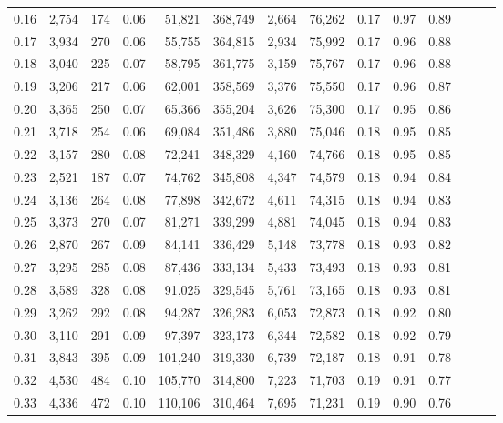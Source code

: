 \begin{tabular}{rrrrrrrrrrrrrr}
0.16 &   2,754 &    174 &  0.06 &   51,821 &  368,749 &   2,664 &  76,262 &  0.17 &  0.97 &      0.89 \\
0.17 &   3,934 &    270 &  0.06 &   55,755 &  364,815 &   2,934 &  75,992 &  0.17 &  0.96 &      0.88 \\
0.18 &   3,040 &    225 &  0.07 &   58,795 &  361,775 &   3,159 &  75,767 &  0.17 &  0.96 &      0.88 \\
0.19 &   3,206 &    217 &  0.06 &   62,001 &  358,569 &   3,376 &  75,550 &  0.17 &  0.96 &      0.87 \\
0.20 &   3,365 &    250 &  0.07 &   65,366 &  355,204 &   3,626 &  75,300 &  0.17 &  0.95 &      0.86 \\
0.21 &   3,718 &    254 &  0.06 &   69,084 &  351,486 &   3,880 &  75,046 &  0.18 &  0.95 &      0.85 \\
0.22 &   3,157 &    280 &  0.08 &   72,241 &  348,329 &   4,160 &  74,766 &  0.18 &  0.95 &      0.85 \\
0.23 &   2,521 &    187 &  0.07 &   74,762 &  345,808 &   4,347 &  74,579 &  0.18 &  0.94 &      0.84 \\
0.24 &   3,136 &    264 &  0.08 &   77,898 &  342,672 &   4,611 &  74,315 &  0.18 &  0.94 &      0.83 \\
0.25 &   3,373 &    270 &  0.07 &   81,271 &  339,299 &   4,881 &  74,045 &  0.18 &  0.94 &      0.83 \\
0.26 &   2,870 &    267 &  0.09 &   84,141 &  336,429 &   5,148 &  73,778 &  0.18 &  0.93 &      0.82 \\
0.27 &   3,295 &    285 &  0.08 &   87,436 &  333,134 &   5,433 &  73,493 &  0.18 &  0.93 &      0.81 \\
0.28 &   3,589 &    328 &  0.08 &   91,025 &  329,545 &   5,761 &  73,165 &  0.18 &  0.93 &      0.81 \\
0.29 &   3,262 &    292 &  0.08 &   94,287 &  326,283 &   6,053 &  72,873 &  0.18 &  0.92 &      0.80 \\
0.30 &   3,110 &    291 &  0.09 &   97,397 &  323,173 &   6,344 &  72,582 &  0.18 &  0.92 &      0.79 \\
0.31 &   3,843 &    395 &  0.09 &  101,240 &  319,330 &   6,739 &  72,187 &  0.18 &  0.91 &      0.78 \\
0.32 &   4,530 &    484 &  0.10 &  105,770 &  314,800 &   7,223 &  71,703 &  0.19 &  0.91 &      0.77 \\
0.33 &   4,336 &    472 &  0.10 &  110,106 &  310,464 &   7,695 &  71,231 &  0.19 &  0.90 &      0.76 \\

\end{tabular}

